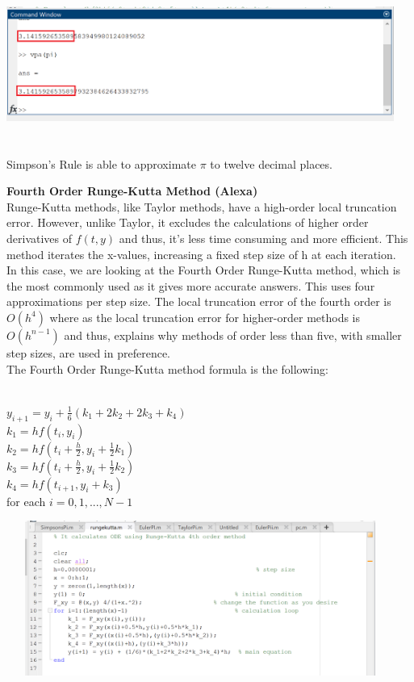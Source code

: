 \documentclass[letterpaper,12pt]{article}
\begin{document}
\begin{center}
    \includegraphics[width=5in, height=2in]{SimpsonResult.png}
\end{center}
Simpson's Rule is able to approximate $\pi$ to twelve decimal places.
    \item \textbf{Fourth Order Runge-Kutta Method (Alexa)}
    \\ \indent Runge-Kutta methods, like Taylor methods, have a high-order local truncation error. However, unlike Taylor, it excludes the calculations of higher order derivatives of $f(t,y)$ and thus, it's less time consuming and more efficient.\cite{Burden15} This method iterates the x-values, increasing a fixed step size of h at each iteration. \cite{Barker17} 
    \\\indent In this case, we are looking at the Fourth Order Runge-Kutta method, which is the most commonly used as it gives more accurate answers. This uses four approximations per step size. The local truncation error of the fourth order is $O(h^4)$ where as the local truncation error for higher-order methods is $O(h^{n-1})$ and thus, explains why methods of order less than five, with smaller step sizes, are used in preference. 
    \\\indent The Fourth Order Runge-Kutta method formula is the following:
    \begin{center}
    \\$y_{i+1}=y_{i}+\tfrac{1}{6}(k_{1}+2k_{2}+2k_{3}+k_{4})$
    \\$k_{1}=hf(t_{i},y_{i})$
    \\$k_{2}=hf(t_{i}+\tfrac{h}{2},y_{i}+\tfrac{1}{2}k_{1})$
    \\$k_{3}=hf(t_{i}+\tfrac{h}{2},y_{i}+\tfrac{1}{2}k_{2})$
    \\$k_{4}=hf(t_{i+1},y_{i}+k_{3})$
    \\ for each $i=0,1,...,N-1$
    \end{center}
\begin{center}
    \includegraphics[width=5in, height=2in]{RungeKCode.png}
\end{center}
\end{document}

